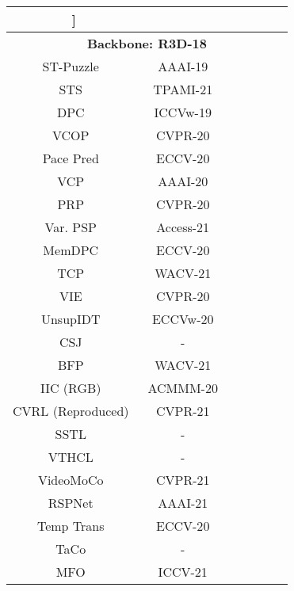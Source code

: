 \documentclass[10pt,twocolumn,letterpaper]{article}
\begin{document}
 





\begin{table*}
\begin{center}
\small
\vspace{-5em}
\begin{tabular}{ccccccc}
\hline

\hline

\hline\-3mm]
\\
 \hline

\hline

\hline
 \multicolumn{7}{c}{\textbf{Backbone: R3D-18}}\\
 \hline
ST-Puzzle~\cite{aaai19} & AAAI-19 &  &  &  &  & \\
STS~\cite{statistics2} & TPAMI-21 &  &  &  &  & \\
DPC~\cite{dpc} & ICCVw-19 &  & & & & \\
VCOP~\cite{vcop} & CVPR-20 &  & &  & & \\
Pace Pred~\cite{pace_pred} & ECCV-20 &  & & & & \\
VCP~\cite{vcp} & AAAI-20 &  & &  & & \\
PRP~\cite{prp} & CVPR-20 &  & &  & &     \\
Var. PSP~\cite{cho2020self} & Access-21 &  & & & & \\
MemDPC~\cite{memdpc} & ECCV-20 &  & & & & \\
TCP~\cite{wacv20} & WACV-21 &  & &  & & \\
VIE~\cite{vie} & CVPR-20 &  &  &  &  &   \\
UnsupIDT~\cite{idt} & ECCVw-20 &  &  &  &    &   \\
CSJ~\cite{csj} & - &  &   &  &  &   \\

BFP~\cite{bfp} & WACV-21 &  &  &  &  & \\
IIC (RGB)~\cite{iic} & ACMMM-20 &  &  &  &  & \\
CVRL (Reproduced)~\cite{cvrl} & CVPR-21 &  &    &   & &    \\
SSTL~\cite{iclr21submitted_st_invariant} & - &  &  &  &  & \textcolor{blue}{} \\
VTHCL~\cite{vtc} & - &  &  &  &  &  \\
VideoMoCo~\cite{videomoco} & CVPR-21 &  &  &  &  & \\
RSPNet~\cite{rspnet} & AAAI-21 &  &  &  &  & \\
Temp Trans~\cite{simon}& ECCV-20 &  & \textcolor{blue}{}  & \textcolor{blue}{}  &  &  \\
TaCo~\cite{taco} & - &  &  &  &  & \\
MFO~\cite{iccv21qian} & ICCV-21 &  &  &  &  & \\


\end{tabular}
\end{center}
\end{table*}
\end{document}
